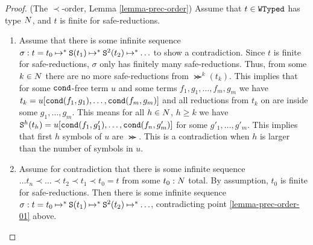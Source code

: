 %
%


\begin{proof}(The $\prec$-order, Lemma \ref{lemma-prec-order})
Assume that $t \in {\tt WTyped}$ has type ${N}$, and $t$ is finite for safe-reductions.
\begin{enumerate}
\item 
Assume that there is some infinite sequence 
$\sigma: t = t_0 \mathbin{\mapsto}^{*} {\tt S}(t_1) \mathbin{\mapsto}^{*} {\tt S}^2(t_2) \mathbin{\mapsto}^{*} \ldots$ 
to show a contradiction. Since $t$ is finite for safe-reductions, 
$\sigma$ only has finitely many safe-reductions. 
Thus, from some $k\in{N}$ there are no more safe-reductions from
$\Succ^k(t_k)$. This implies that for some ${\tt cond}$-free term 
$u$ and some terms $f_1, g_1, \ldots, f_m, g_m$ we have
$t_k = u[{\tt cond}(f_1,g_1), \ldots, {\tt cond}(f_m,g_m)]$ and all reductions from $t_k$ on are inside
some $g_1, \ldots, g_m$. This means for all $h \in {N}$, $h \ge k$ we  have
${\tt S}^{h}(t_{h}) =  u[{\tt cond}(f_1,g'_1), \ldots, {\tt cond}(f_n,g'_m)]$ for some 
$g'_1, \ldots, g'_m$. This implies that first $h$ symbols of $u$ are $\Succ$.
This is a contradiction when $h$ is larger than 
the number of symbols in $u$.

\item
Assume for contradiction that there is some infinite sequence
$\ldots t_n \prec \ldots \prec t_2 \prec t_1 \prec t_0 = t$
from some $t_0:{N}$ total. By assumption, $t_0$ is finite for safe-reductions.
Then there is some infinite sequence 
$\sigma: t = t_0 \mathbin{\mapsto}^{*} {\tt S}(t_1) \mathbin{\mapsto}^{*} {\tt S}^2(t_2) \mathbin{\mapsto}^{*} \ldots$,
contradicting point \ref{lemma-prec-order-01} above.
\end{enumerate}
\end{proof}




